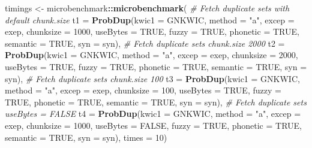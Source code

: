 \documentclass[]{article}
\newenvironment{Shaded}{\begin{snugshade}}{\end{snugshade}}
\newcommand{\CommentTok}[1]{\textcolor[rgb]{0.56,0.35,0.01}{\textit{#1}}}
\newcommand{\DataTypeTok}[1]{\textcolor[rgb]{0.13,0.29,0.53}{#1}}
\newcommand{\DecValTok}[1]{\textcolor[rgb]{0.00,0.00,0.81}{#1}}
\newcommand{\KeywordTok}[1]{\textcolor[rgb]{0.13,0.29,0.53}{\textbf{#1}}}
\newcommand{\NormalTok}[1]{#1}
\newcommand{\OperatorTok}[1]{\textcolor[rgb]{0.81,0.36,0.00}{\textbf{#1}}}
\newcommand{\OtherTok}[1]{\textcolor[rgb]{0.56,0.35,0.01}{#1}}
\newcommand{\StringTok}[1]{\textcolor[rgb]{0.31,0.60,0.02}{#1}}
\begin{document}
\begin{Shaded}
\begin{Highlighting}[]
\NormalTok{timings <-}\StringTok{ }\NormalTok{microbenchmark}\OperatorTok{::}\KeywordTok{microbenchmark}\NormalTok{(}
  \CommentTok{# Fetch duplicate sets with default chunk.size}
  \DataTypeTok{t1 =} \KeywordTok{ProbDup}\NormalTok{(}\DataTypeTok{kwic1 =}\NormalTok{ GNKWIC, }\DataTypeTok{method =} \StringTok{"a"}\NormalTok{, }\DataTypeTok{excep =}\NormalTok{ exep,}
                                     \DataTypeTok{chunksize =} \DecValTok{1000}\NormalTok{, }\DataTypeTok{useBytes =} \OtherTok{TRUE}\NormalTok{,}
                                     \DataTypeTok{fuzzy =} \OtherTok{TRUE}\NormalTok{, }\DataTypeTok{phonetic =} \OtherTok{TRUE}\NormalTok{,}
                                     \DataTypeTok{semantic =} \OtherTok{TRUE}\NormalTok{, }\DataTypeTok{syn =}\NormalTok{ syn),}
  \CommentTok{# Fetch duplicate sets chunk.size 2000}
  \DataTypeTok{t2 =} \KeywordTok{ProbDup}\NormalTok{(}\DataTypeTok{kwic1 =}\NormalTok{ GNKWIC, }\DataTypeTok{method =} \StringTok{"a"}\NormalTok{, }\DataTypeTok{excep =}\NormalTok{ exep,}
                                     \DataTypeTok{chunksize =} \DecValTok{2000}\NormalTok{, }\DataTypeTok{useBytes =} \OtherTok{TRUE}\NormalTok{,}
                                     \DataTypeTok{fuzzy =} \OtherTok{TRUE}\NormalTok{, }\DataTypeTok{phonetic =} \OtherTok{TRUE}\NormalTok{,}
                                     \DataTypeTok{semantic =} \OtherTok{TRUE}\NormalTok{, }\DataTypeTok{syn =}\NormalTok{ syn),}
  \CommentTok{# Fetch duplicate sets chunk.size 100}
  \DataTypeTok{t3 =} \KeywordTok{ProbDup}\NormalTok{(}\DataTypeTok{kwic1 =}\NormalTok{ GNKWIC, }\DataTypeTok{method =} \StringTok{"a"}\NormalTok{, }\DataTypeTok{excep =}\NormalTok{ exep,}
                                     \DataTypeTok{chunksize =} \DecValTok{100}\NormalTok{, }\DataTypeTok{useBytes =} \OtherTok{TRUE}\NormalTok{,}
                                     \DataTypeTok{fuzzy =} \OtherTok{TRUE}\NormalTok{, }\DataTypeTok{phonetic =} \OtherTok{TRUE}\NormalTok{,}
                                     \DataTypeTok{semantic =} \OtherTok{TRUE}\NormalTok{, }\DataTypeTok{syn =}\NormalTok{ syn),}
  \CommentTok{# Fetch duplicate sets useBytes = FALSE}
  \DataTypeTok{t4 =} \KeywordTok{ProbDup}\NormalTok{(}\DataTypeTok{kwic1 =}\NormalTok{ GNKWIC, }\DataTypeTok{method =} \StringTok{"a"}\NormalTok{, }\DataTypeTok{excep =}\NormalTok{ exep,}
                                     \DataTypeTok{chunksize =} \DecValTok{1000}\NormalTok{, }\DataTypeTok{useBytes =} \OtherTok{FALSE}\NormalTok{,}
                                     \DataTypeTok{fuzzy =} \OtherTok{TRUE}\NormalTok{, }\DataTypeTok{phonetic =} \OtherTok{TRUE}\NormalTok{,}
                                     \DataTypeTok{semantic =} \OtherTok{TRUE}\NormalTok{, }\DataTypeTok{syn =}\NormalTok{ syn), }\DataTypeTok{times =} \DecValTok{10}\NormalTok{)}
\end{Highlighting}
\end{Shaded}
\end{document}
